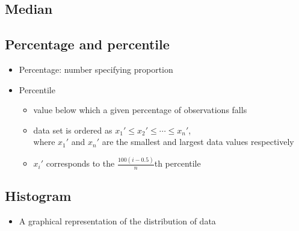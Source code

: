 \documentclass[a4paper]{article}
\begin{document}
\subsection{Median}
\subsection{Percentage and percentile}
\begin{itemize}
    \item Percentage: number specifying proportion
    \item Percentile
    \begin{itemize}[label=$\circ$]
        \item value below which a given percentage of observations falls
        \item data set is ordered as $x_{1}' \leq x_{2}'\leq \cdots \leq x_{n}'$,\\ where $x_{1}'$ and $x_{n}'$ are the smallest and largest data values respectively
        \item $x_{i}'$ corresponds to the $\frac{100(i-0.5)}{n}$th percentile
    \end{itemize}
\end{itemize}
\subsection{Histogram}
\begin{itemize}
    \item A graphical representation of the distribution of data
\end{itemize}
\mbox{}
\begin{center}
\end{center}
\end{document}
